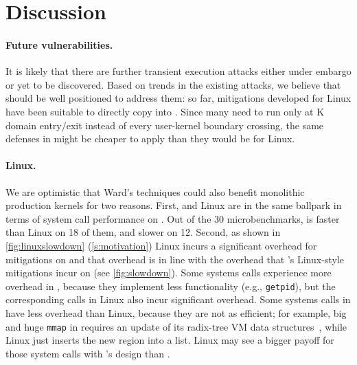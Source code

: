 \section{Discussion}
\label{s:ward-discussion}

\paragraph{Future vulnerabilities.}

It is likely that there are further transient
execution attacks either under embargo or yet to be discovered. Based on trends
in the existing attacks, we believe that \sys should be well positioned to
address them: so far, mitigations developed for Linux have been suitable to
directly copy into \sys. Since many need to run only at K domain entry/exit
instead of every user-kernel boundary crossing, the same defenses in \sys
might be cheaper to apply than they would be for Linux.

\paragraph{Linux.}


We are optimistic that Ward's techniques could also benefit monolithic
production kernels for two reasons.
First, \sys and Linux are in the same ballpark in terms of system call
performance on \bench.  Out of the 30 microbenchmarks, \sys is faster than
Linux on 18 of them, and slower on 12.
Second, as shown in \autoref{fig:linuxslowdown} (\autoref{s:motivation})
Linux incurs a significant overhead for mitigations on \bench and that
overhead is in line with the overhead that \sys's Linux-style mitigations
incur on \bench (see
\autoref{fig:slowdown}).  Some systems calls experience more overhead in
\sys, because they implement less functionality (e.g., \texttt{getpid}),
but the corresponding calls in Linux also incur significant overhead.
Some systems calls in \sys have less overhead than Linux, because they are
not as efficient; for example, big and huge \texttt{mmap} in \sys requires
an update of its radix-tree VM data structures~\cite{clements:radixvm},
while Linux just inserts the new region into a list. Linux may see a
bigger payoff for those system calls with \sys's design than \sys.

